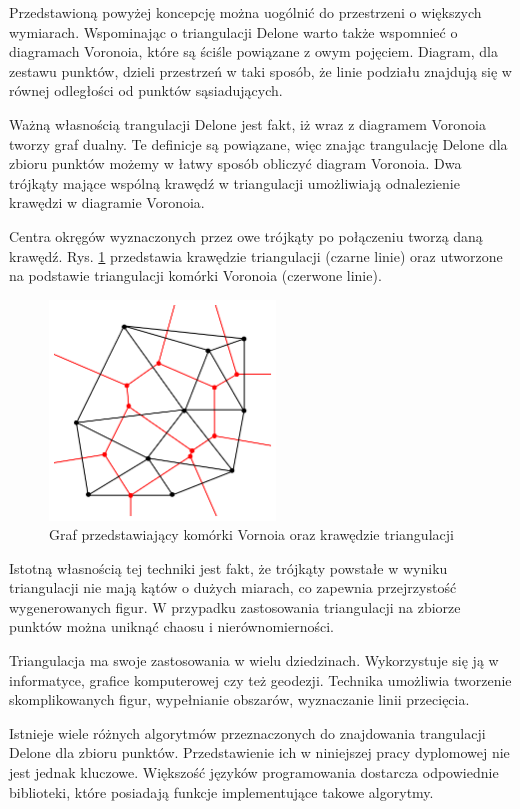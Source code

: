 Przedstawioną powyżej koncepcję można uogólnić do przestrzeni o większych wymiarach. Wspominając o triangulacji Delone warto także wspomnieć o diagramach Voronoia, które są ściśle powiązane z owym pojęciem. Diagram, dla zestawu punktów, dzieli przestrzeń w taki sposób, że linie podziału znajdują się w równej odległości od punktów sąsiadujących.

Ważną własnością trangulacji Delone jest fakt, iż wraz z diagramem Voronoia tworzy graf dualny. Te definicje są powiązane, więc znając trangulację Delone dla zbioru punktów możemy w łatwy sposób obliczyć diagram Voronoia. Dwa trójkąty mające wspólną krawędź w triangulacji umożliwiają odnalezienie krawędzi w diagramie Voronoia. 

Centra okręgów wyznaczonych przez owe trójkąty po połączeniu tworzą daną krawędź. Rys. \ref{fig:voronoi}  przedstawia krawędzie triangulacji (czarne linie) oraz utworzone na podstawie triangulacji komórki Voronoia (czerwone linie).

\begin{figure}[h]
	\centering
	\includegraphics[width=6cm]{zdjęcia/voronoi.png}
	\caption{Graf przedstawiający komórki Vornoia oraz krawędzie triangulacji \cite{tDelone}} 
	\label{fig:voronoi}
\end{figure}

Istotną własnością tej techniki jest fakt, że trójkąty powstałe w wyniku triangulacji nie mają kątów o dużych miarach, co zapewnia przejrzystość wygenerowanych figur. W przypadku zastosowania triangulacji na zbiorze punktów można uniknąć chaosu i nierównomierności.

Triangulacja ma swoje zastosowania w wielu dziedzinach. Wykorzystuje się ją w informatyce, grafice komputerowej czy też geodezji. Technika umożliwia tworzenie skomplikowanych figur, wypełnianie obszarów, wyznaczanie linii przecięcia.

Istnieje wiele różnych algorytmów przeznaczonych do znajdowania trangulacji Delone dla zbioru punktów. Przedstawienie ich w niniejszej pracy dyplomowej nie jest jednak kluczowe. Większość języków programowania dostarcza odpowiednie biblioteki, które posiadają funkcje implementujące takowe algorytmy. 


